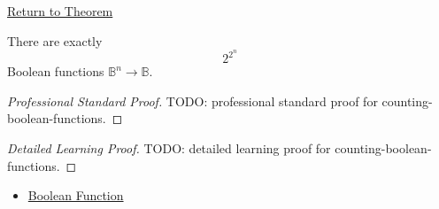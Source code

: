 \newpage
{}
\label{prf:counting-boolean-functions}

\begin{remark*}[Return]
\hyperref[thm:counting-boolean-functions]{Return to Theorem}
\end{remark*}

\begin{theorem*}
There are exactly
\[
2^{2^n}
\]
Boolean functions \(\mathbb{B}^n\to\mathbb{B}\).
\end{theorem*}

\begin{proof}[Professional Standard Proof]
\LRAProofBodyStart
TODO: professional standard proof for counting-boolean-functions.
\end{proof}

\begin{proof}[Detailed Learning Proof]
\LRAProofBodyStart
TODO: detailed learning proof for counting-boolean-functions.
\end{proof}

\begin{remark*}
\end{remark*}

\begin{dependencies}
\begin{itemize}
  \item \hyperref[def:boolean-function-propositional-logic]{Boolean Function}
\end{itemize}
\end{dependencies}

\clearpage
